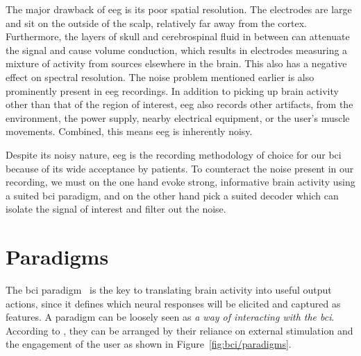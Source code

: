 The major drawback of \ac{eeg} is its poor spatial resolution.
The electrodes are large and sit on the outside of the scalp, relatively far
away from the cortex.
Furthermore, the layers of skull and cerebrospinal fluid in between can
attenuate the signal and cause volume conduction, which results in electrodes
measuring a mixture of activity from sources elsewhere in the brain.
This also has a negative effect on spectral resolution.
The noise problem mentioned earlier is also prominently present in \ac{eeg}
recordings.
In addition to picking up brain activity other than that of the region of
interest, \ac{eeg} also records other artifacts, from the environment, the power
supply, nearby electrical equipment, or the user's muscle movements.
Combined, this means \ac{eeg} is inherently noisy.

Despite its noisy nature, \ac{eeg} is the recording methodology of choice for
our \ac{bci} because of its wide acceptance by patients.
To counteract the noise present in our recording, we must on the one hand evoke
strong, informative brain activity using a suited \ac{bci} paradigm, and on the
other hand pick a suited decoder which can isolate the signal of interest and
filter out the noise.

\section{Paradigms}
\label{sec:bci/paradigms}

The \ac{bci} paradigm~\cite{Xu2021,Neeling2019} is the key to translating brain activity into useful
output actions, since it defines which neural responses will be elicited and
captured as features.
A paradigm can be loosely seen as \emph{a way of interacting with the
\ac{bci}}.
According to \textcite{Zander2011}, they can be arranged by their reliance on
external stimulation and the engagement of the user as shown in
Figure~\ref{fig:bci/paradigms}.

